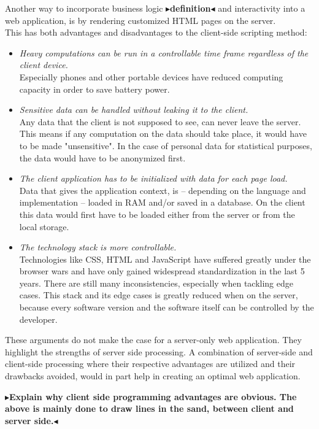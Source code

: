 \documentclass[twoside,11pt,openright]{report}
\newcommand{\todo}[1]{{\color[rgb]{.5,0,0}\textbf{$\blacktriangleright$#1$\blacktriangleleft$}}}
\begin{document}
Another way to incorporate business logic \todo{definition} and
interactivity into a web application, is by rendering customized HTML pages
on the server.\\
This has both advantages and disadvantages to the client-side scripting method:
\begin{itemize}
	\item \emph{Heavy computations can be run in a controllable time frame
	regardless of the client device.}\\
		Especially phones and other portable devices have reduced computing
		capacity in order to save battery power.
	\item \emph{Sensitive data can be handled without leaking it to the
	client.}\\
		Any data that the client is not supposed to see, can never leave the
		server. This means if any computation on the data should take place,
		it would have to be made "unsensitive". In the case of personal data
		for statistical purposes, the data would have to be anonymized first.
	\item \emph{The client application has to be initialized with data for each
	page load.}\\
		Data that gives the application context, is -- depending on the language
		and implementation -- loaded in RAM and/or saved in a database. On the
		client this data would first have to be loaded either from the server or
		from the local storage.
	\item \emph{The technology stack is more controllable.}\\
		Technologies like CSS, HTML and JavaScript have suffered greatly under
		the browser wars and have only gained widespread standardization in the
		last 5 years. There are still many inconsistencies, especially when
		tackling edge cases. This stack and its edge cases is greatly reduced when
		on the server, because every software version and the software itself can
		be controlled by the developer.
\end{itemize}

These arguments do not make the case for a server-only web application.
They highlight the strengths of server side processing. A combination of
server-side and client-side processing where their respective advantages
are utilized and their drawbacks avoided, would in part help in creating
an optimal web application.

\todo{Explain why client side programming advantages are obvious.
The above is mainly done to draw lines in the sand, between client
and server side.}
\end{document}
